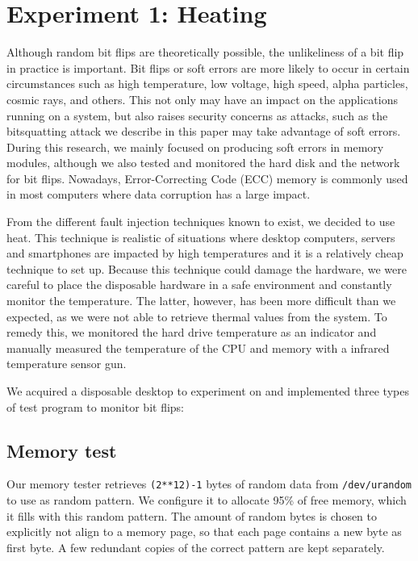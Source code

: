 \documentclass[conference]{IEEEtran}
\begin{document}
\section{Experiment 1: Heating}

Although random bit flips are theoretically possible, the unlikeliness of a bit
flip in practice is important. Bit flips or soft errors are more likely to
occur in certain circumstances such as high temperature, low voltage, high
speed, alpha particles, cosmic rays, and others. This not only may have an
impact on the applications running on a system, but also raises security
concerns as attacks, such as the bitsquatting attack we describe in this paper
may take advantage of soft errors. During this research, we mainly focused on
producing soft errors in memory modules, although we also tested and monitored
the hard disk and the network for bit flips. Nowadays, Error-Correcting Code
(ECC) memory is commonly used in most computers where data corruption has a
large impact.

From the different fault injection techniques known to
exist\cite{barenghi2012fault}, we decided to use heat. This technique is
realistic of situations where desktop computers, servers and smartphones are
impacted by high temperatures and it is a relatively cheap technique to set up.
Because this technique could damage the hardware, we were careful to place the
disposable hardware in a safe environment and constantly monitor the
temperature. The latter, however, has been more difficult than we expected, as
we were not able to retrieve thermal values from the system. To remedy this, we
monitored the hard drive temperature as an indicator and manually measured the
temperature of the CPU and memory with a infrared temperature sensor gun.

We acquired a disposable desktop to experiment on and implemented three types
of test program to monitor bit flips:

\subsection{Memory test}

Our memory tester retrieves \texttt{(2**12)-1} bytes of random data from
\texttt{/dev/urandom} to use as random pattern. We configure it to allocate
95\% of free memory, which it fills with this random pattern. The amount of
random bytes is chosen to explicitly not align to a memory page, so that each
page contains a new byte as first byte. A few redundant copies of the correct
pattern are kept separately.
\end{document}
